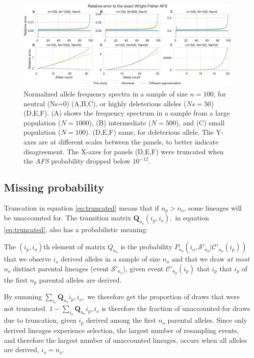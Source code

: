 \documentclass[review]{elsarticle}
\begin{document}
\begin{figure}
  \centering
  \includegraphics[width=0.7\textheight]{fig/strong_selection_six_panel.pdf}
  \caption{Normalized allele frequency spectra in a sample of size $n=100$, for neutral (Ns=0)
    (A,B,C), or highly deleterious alleles ($Ns=50$) (D,E,F). (A) shows the frequency spectrum in a
    sample from a large population ($N=1000$), (B) intermediate ($N=500$), and (C) small population
    ($N=100$). (D,E,F) same, for deleterious allele. The Y-axes are at different scales between the
    panels, to better indicate disagreement. The X-axes for panels (D,E,F) were truncated
    when the \textit{AFS} probability dropped below $10^{-12}$. }
  \label{fig:strong-selection}
\end{figure}

\subsection{Missing probability}
\label{subsec:missing}

Truncation in equation \ref{eq:truncated} means that if $n_p > n_o$, some lineages will be
unaccounted for. The transition matrix $\mathbf{Q}_{n_o}(i_p, i_o),$ in equation
\eqref{eq:truncated}, also has a probabilistic meaning:

The $(i_p,i_o)$th element of matrix $Q_{n_o}$ is the probability
 $P_{n_o}(i_o, \mathcal{S'}_{n_p}| \mathcal{C'}_{n_p}(i_p))$ that we observe $i_o$ derived alleles in
 a sample of size $n_o$ and that we draw \emph{at most} $n_o$ distinct parental lineages (event
 $\mathcal{S'}_{n_o}$), given event $\mathcal{C'}_{n_p}(i_p)$ that $i_p$ that $i_p$ of the first
 $n_p$ parental alleles are derived.

By summing $\sum_{i_o} \mathbf{Q}_{n_o}{i_p, i_o},$ we therefore get the proportion of draws that
were not truncated. $1-\sum_{i_o} \mathbf{Q}_{n_o}{i_p, i_o}$ is therefore the fraction of
unaccounted-for draws due to truncation, given $i_p$ derived among the first $n_o$ parental
alleles. Since only derived lineages experience selection, the largest number of resampling events,
and therefore the largest number of unaccounted lineages, occurs when all alleles are derived,
$i_o = n_o$.
\end{document}
